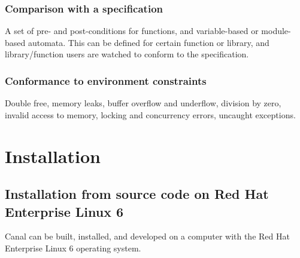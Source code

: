 \documentclass[a4paper]{book}
\begin{document}
\subsection{Comparison with a specification}
A set of pre- and post-conditions for functions, and variable-based or
module-based automata.  This can be defined for certain function or
library, and library/function users are watched to conform to the
specification.

\subsection{Conformance to environment constraints}
Double free, memory leaks, buffer overflow and underflow, division by
zero, invalid access to memory, locking and concurrency errors,
uncaught exceptions.


\chapter{Installation}





\section{Installation from source code on Red Hat Enterprise Linux 6}

Canal can be built, installed, and developed on a computer with the
Red Hat Enterprise Linux 6 operating system.
\end{document}
